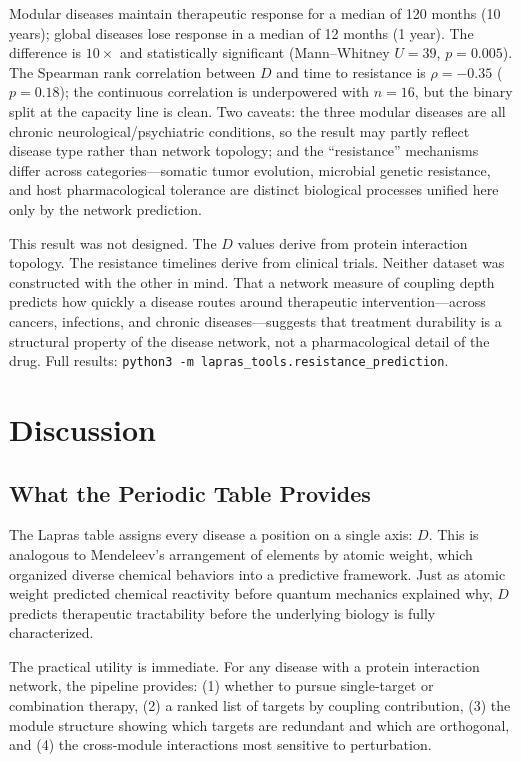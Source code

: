 \documentclass[11pt,a4paper]{article}
\begin{document}
Modular diseases maintain therapeutic response for a median of 120 months (10 years); global diseases lose response in a median of 12 months (1 year). The difference is $10\times$ and statistically significant (Mann--Whitney $U = 39$, $p = 0.005$). The Spearman rank correlation between $D$ and time to resistance is $\rho = -0.35$ ($p = 0.18$); the continuous correlation is underpowered with $n = 16$, but the binary split at the capacity line is clean. Two caveats: the three modular diseases are all chronic neurological/psychiatric conditions, so the result may partly reflect disease type rather than network topology; and the ``resistance'' mechanisms differ across categories---somatic tumor evolution, microbial genetic resistance, and host pharmacological tolerance are distinct biological processes unified here only by the network prediction.

This result was not designed. The $D$ values derive from protein interaction topology. The resistance timelines derive from clinical trials. Neither dataset was constructed with the other in mind. That a network measure of coupling depth predicts how quickly a disease routes around therapeutic intervention---across cancers, infections, and chronic diseases---suggests that treatment durability is a structural property of the disease network, not a pharmacological detail of the drug. Full results: \texttt{python3 -m lapras\_tools.resistance\_prediction}.

\section{Discussion}

\subsection{What the Periodic Table Provides}

The Lapras table assigns every disease a position on a single axis: $D$. This is analogous to Mendeleev's arrangement of elements by atomic weight, which organized diverse chemical behaviors into a predictive framework. Just as atomic weight predicted chemical reactivity before quantum mechanics explained why, $D$ predicts therapeutic tractability before the underlying biology is fully characterized.

The practical utility is immediate. For any disease with a protein interaction network, the pipeline provides: (1) whether to pursue single-target or combination therapy, (2) a ranked list of targets by coupling contribution, (3) the module structure showing which targets are redundant and which are orthogonal, and (4) the cross-module interactions most sensitive to perturbation.
\end{document}
